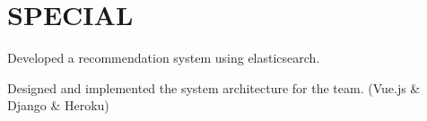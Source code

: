 \documentclass[]{resume}
\begin{document}
\begin{minipage}[t]{0.68\textwidth}

\section{SPECIAL}
Developed a recommendation system using elasticsearch.
\sectionsep

Designed and implemented the system architecture for the team. (Vue.js \& Django \& Heroku)

\end{minipage} 
\end{document}
